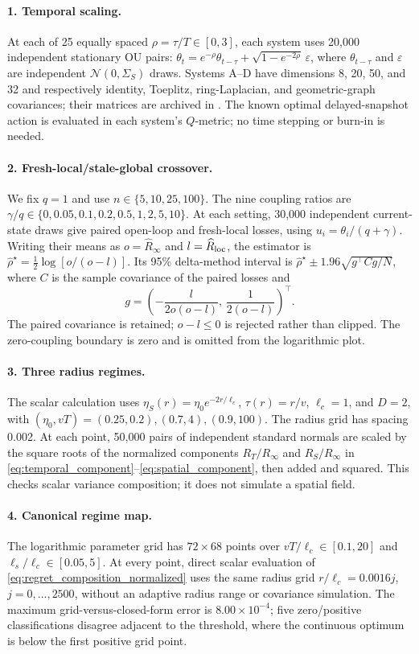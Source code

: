 \paragraph{1. Temporal scaling.}
At each of 25 equally spaced $\rho=\tau/T\in[0,3]$, each system uses
20,000 independent stationary OU pairs:
$\theta_t=e^{-\rho}\theta_{t-\tau}+\sqrt{1-e^{-2\rho}}\,\varepsilon$,
where $\theta_{t-\tau}$ and $\varepsilon$ are independent
$\mathcal N(0,\Sigma_S)$ draws. Systems A--D have dimensions 8, 20, 50, and 32
and respectively identity, Toeplitz, ring-Laplacian, and geometric-graph
covariances; their matrices are archived in
.
The known optimal delayed-snapshot action is evaluated in each system's
$Q$-metric; no time stepping or burn-in is needed.

\paragraph{2. Fresh-local/stale-global crossover.}
We fix $q=1$ and use $n\in\{5,10,25,100\}$.
The nine coupling ratios are $\gamma/q\in\{0,0.05,0.1,0.2,0.5,1,2,5,10\}$.
At each setting, 30,000 independent current-state draws give paired open-loop and fresh-local
losses, using $u_i=\theta_i/(q+\gamma)$.
Writing their means as $o=\widehat R_\infty$ and
$l=\widehat R_{\rm loc}$, the estimator is
$\widehat\rho^\star=\tfrac12\log[o/(o-l)]$.
Its 95\% delta-method interval is
$\widehat\rho^\star\pm1.96\sqrt{g^\top Cg/N}$, where $C$ is the sample
covariance of the paired losses and
\[
g=\left(-\frac{l}{2o(o-l)},\,\frac{1}{2(o-l)}\right)^\top.
\]
The paired covariance is retained; $o-l\le0$ is rejected rather than clipped.
The zero-coupling boundary is zero and is omitted from the logarithmic plot.

\paragraph{3. Three radius regimes.}
The scalar calculation uses $\eta_S(r)=\eta_0e^{-2r/\ell_c}$,
$\tau(r)=r/v$, $\ell_c=1$, and $D=2$, with
$(\eta_0,vT)=(0.25,0.2),(0.7,4),(0.9,100)$.
The radius grid has spacing 0.002. At each point, 50,000 pairs of independent
standard normals are scaled by the square roots of the normalized components
$R_T/R_\infty$ and $R_S/R_\infty$ in
\eqref{eq:temporal_component}--\eqref{eq:spatial_component}, then added
and squared. This checks scalar variance composition; it does not simulate
a spatial field.

\paragraph{4. Canonical regime map.}
The logarithmic parameter grid has $72\times68$ points over
$vT/\ell_c\in[0.1,20]$ and $\ell_s/\ell_c\in[0.05,5]$.
At every point, direct scalar evaluation of
\eqref{eq:regret_composition_normalized} uses the same radius grid
$r/\ell_c=0.0016j$, $j=0,\ldots,2500$, without an adaptive radius range or
covariance simulation. The maximum grid-versus-closed-form error is
$8.00\times10^{-4}$; five zero/positive classifications disagree adjacent
to the threshold, where the continuous optimum is below the first positive
grid point.

